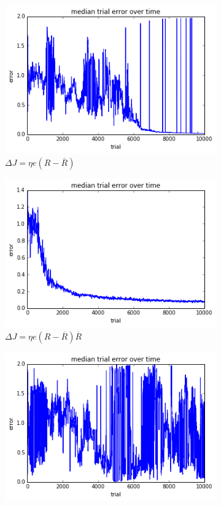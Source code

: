 \documentclass{article}
\theoremstyle{plain}
\theoremstyle{definition}
\theoremstyle{remark}
\begin{document}
\begin{figure}
\begin{subfigure}{.5\textwidth}
  \centering
  \includegraphics[width=.8\linewidth]{10k_no_rbar}
  \caption{$\Delta J = \eta e (R - \overline{R})$}
  \label{fig:sfig1}
\end{subfigure}%
\begin{subfigure}{.5\textwidth}
  \centering
  \includegraphics[width=.8\linewidth]{10k_normal}
  \caption{$\Delta J = \eta e (R - \overline{R}) \overline{R}$}
  \label{fig:sfig2}
\end{subfigure}
\begin{subfigure}{.5\textwidth}
  \centering
  \includegraphics[width=.8\linewidth]{10k_two_bins}

\end{subfigure}
\end{figure}
\end{document}
